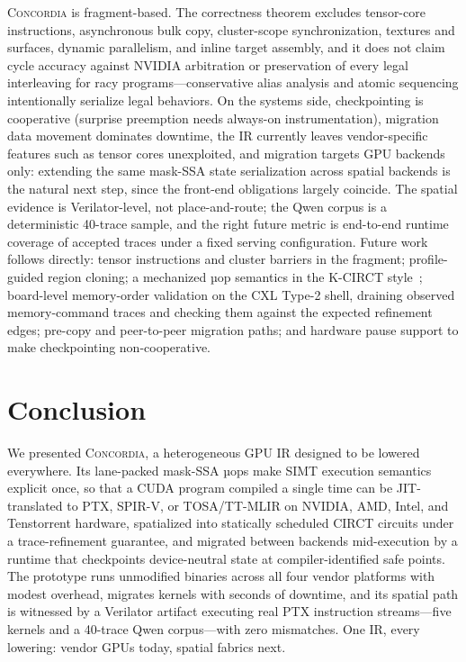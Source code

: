 \documentclass[sigplan,nonacm]{acmart}
\newcommand{\sys}{\textsc{Concordia}\xspace}
\newcommand{\circt}{CIRCT\xspace}
\begin{document}
\sys is fragment-based.  The correctness theorem excludes tensor-core
instructions, asynchronous bulk copy, cluster-scope synchronization,
textures and surfaces, dynamic parallelism, and inline target assembly, and
it does not claim cycle accuracy against NVIDIA arbitration or preservation
of every legal interleaving for racy programs---conservative alias analysis
and atomic sequencing intentionally serialize legal behaviors.  On the
systems side, checkpointing is cooperative (surprise preemption needs
always-on instrumentation), migration data movement dominates downtime, the
IR currently leaves vendor-specific features such as tensor cores
unexploited, and migration targets GPU backends only: extending the same
mask-SSA state serialization across spatial backends is the natural next
step, since the front-end obligations largely coincide.  The spatial
evidence is Verilator-level, not place-and-route; the Qwen corpus is a
deterministic 40-trace sample, and the right future metric is end-to-end
runtime coverage of accepted traces under a fixed serving configuration.
Future work follows directly: tensor instructions and cluster barriers in
the fragment; profile-guided region cloning; a mechanized µop semantics in
the K-CIRCT style~\cite{zhao2024kcirct}; board-level memory-order validation
on the CXL Type-2 shell, draining observed memory-command traces and
checking them against the expected refinement edges; pre-copy and
peer-to-peer migration paths; and hardware pause support to make
checkpointing non-cooperative.

\section{Conclusion}
\label{sec:conclusion}

We presented \sys, a heterogeneous GPU IR designed to be lowered everywhere.
Its lane-packed mask-SSA µops make SIMT execution semantics explicit once,
so that a CUDA program compiled a single time can be JIT-translated to PTX,
SPIR-V, or TOSA/TT-MLIR on NVIDIA, AMD, Intel, and Tenstorrent hardware,
spatialized into statically scheduled \circt circuits under a
trace-refinement guarantee, and migrated between backends mid-execution by
a runtime that checkpoints device-neutral state at compiler-identified safe
points.  The prototype runs unmodified binaries across all four vendor
platforms with modest overhead, migrates kernels with seconds of downtime,
and its spatial path is witnessed by a Verilator artifact executing real
PTX instruction streams---five kernels and a 40-trace Qwen corpus---with
zero mismatches.  One IR, every lowering: vendor GPUs today, spatial
fabrics next.



\end{document}
